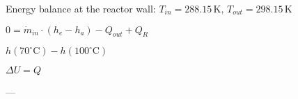 Energy balance at the reactor wall:  
\( T_{in} = 288.15 \, \text{K}, \, T_{out} = 298.15 \, \text{K} \)  

\( 0 = \dot{m}_{in} \cdot (h_e - h_a) - Q_{out} + Q_R \)  

\( h(70^\circ \text{C}) - h(100^\circ \text{C}) \)  

\( \Delta U = Q \)  

---